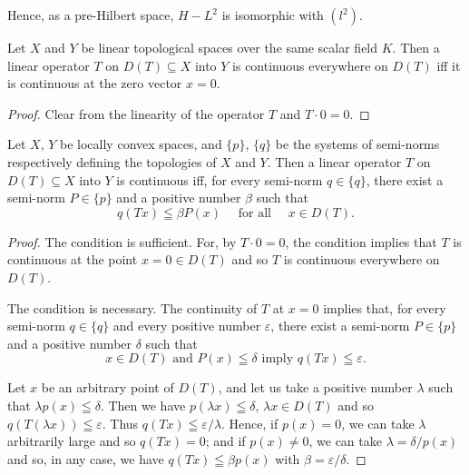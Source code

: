 Hence, as a pre-Hilbert space, $H- L^2$ is isomorphic with $(l^2)$. 


\label{sec:I.6}

\begin{proposition}\label{prop:I.6.Proposition.1} Let $X$ and $Y$ be linear topological spaces over the same scalar field $K$. Then a linear operator $T$ on $D(T) \subseteq X$ into $Y$ is continuous everywhere on $D(T)$ iff it is continuous at the zero vector $x = 0$. 
\end{proposition}

\begin{proof}
 Clear from the linearity of the operator $T$ and $T \cdot 0 = 0$. 
\end{proof}

\begin{theorem}\label{thm:I.6.Theorem.1} Let $X$, $Y$ be locally convex spaces, and $\{p\}$, $\{q\}$ be the systems of semi-norms respectively defining the topologies of $X$ and $Y$. Then a linear operator $T$ on $D(T) \subseteq X$ into $Y$ is continuous iff, for every semi-norm $q \in \{q\}$, there exist a semi-norm $P\in \{p\}$ and a positive number $\beta$ such that 
\begin{equation}\label{eq:I.6.1}
q (T x) \leqq \beta P(x) \quad \text{ for all } \quad x \in D (T).
\end{equation}
\end{theorem}

\begin{proof}
 The condition is sufficient. For, by $T \cdot 0 = 0$, the condition implies that $T$ is continuous at the point $x = 0 \in D(T)$ and so $T$ is continuous everywhere on $D(T)$. 


The condition is necessary. The continuity of $T$ at $x = 0$ implies that, for every semi-norm $q \in \{q\}$ and every positive number $\varepsilon$, there exist a semi-norm $P\in \{p\}$ and a positive number $\delta$ such that 
\[
x \in D (T) \text{ and } P(x) \leqq \delta \text{ imply } q (T x) \leqq \varepsilon .
\]

Let $x$ be an arbitrary point of $D(T)$, and let us take a positive number $\lambda$ such that $\lambda p(x) \leqq \delta$. Then we have $p(\lambda x) \leqq \delta$, $\lambda x \in D(T)$ and so $q(T(\lambda x)) \leqq \varepsilon$. Thus $q(Tx) \leqq \varepsilon / \lambda$. Hence, if $p(x) = 0$, we can take $\lambda$ arbitrarily large and so $q(Tx) = 0$; and if $p(x) \neq 0$, we can take $\lambda = \delta / p(x)$ and so, in any case, we have $q(Tx) \leqq \beta p(x)$ with $\beta = \varepsilon / \delta$.
\end{proof}

